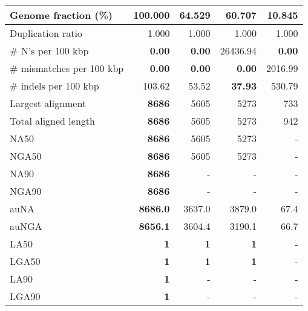 \documentclass[12pt,a4paper]{article}
\begin{document}
\begin{table}[ht]
\begin{center}
\begin{tabular}{|l*{4}{|r}|}
Genome fraction (\%) & {\bf 100.000} & 64.529 & 60.707 & 10.845 \\ \hline
Duplication ratio & 1.000 & 1.000 & 1.000 & 1.000 \\ \hline
\# N's per 100 kbp & {\bf 0.00} & {\bf 0.00} & 26436.94 & {\bf 0.00} \\ \hline
\# mismatches per 100 kbp & {\bf 0.00} & {\bf 0.00} & {\bf 0.00} & 2016.99 \\ \hline
\# indels per 100 kbp & 103.62 & 53.52 & {\bf 37.93} & 530.79 \\ \hline
Largest alignment & {\bf 8686} & 5605 & 5273 & 733 \\ \hline
Total aligned length & {\bf 8686} & 5605 & 5273 & 942 \\ \hline
NA50 & {\bf 8686} & 5605 & 5273 & - \\ \hline
NGA50 & {\bf 8686} & 5605 & 5273 & - \\ \hline
NA90 & {\bf 8686} & - & - & - \\ \hline
NGA90 & {\bf 8686} & - & - & - \\ \hline
auNA & {\bf 8686.0} & 3637.0 & 3879.0 & 67.4 \\ \hline
auNGA & {\bf 8656.1} & 3604.4 & 3190.1 & 66.7 \\ \hline
LA50 & {\bf 1} & {\bf 1} & {\bf 1} & - \\ \hline
LGA50 & {\bf 1} & {\bf 1} & {\bf 1} & - \\ \hline
LA90 & {\bf 1} & - & - & - \\ \hline
LGA90 & {\bf 1} & - & - & - \\ \hline
\end{tabular}
\end{center}
\end{table}
\end{document}

